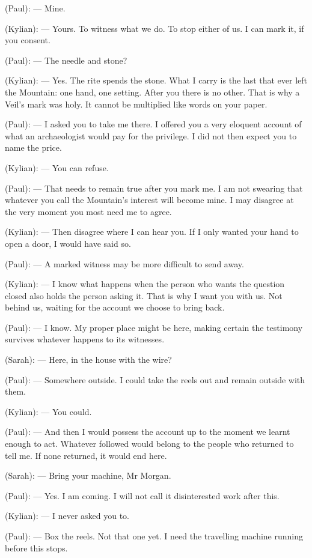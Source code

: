 \begin{room}
(Paul): --- Mine.

(Kylian): --- Yours. To witness what we do. To stop either of us. I can mark it, if you consent.

(Paul): --- The needle and stone?

(Kylian): --- Yes. The rite spends the stone. What I carry is the last that ever left the Mountain: one hand, one setting. After you there is no other. That is why a Veil's mark was holy. It cannot be multiplied like words on your paper.

(Paul): --- I asked you to take me there. I offered you a very eloquent account of what an archaeologist would pay for the privilege. I did not then expect you to name the price.

(Kylian): --- You can refuse.

(Paul): --- That needs to remain true after you mark me. I am not swearing that whatever you call the Mountain's interest will become mine. I may disagree at the very moment you most need me to agree.

(Kylian): --- Then disagree where I can hear you. If I only wanted your hand to open a door, I would have said so.

(Paul): --- A marked witness may be more difficult to send away.

(Kylian): --- I know what happens when the person who wants the question closed also holds the person asking it. That is why I want you with us. Not behind us, waiting for the account we choose to bring back.

(Paul): --- I know. My proper place might be here, making certain the testimony survives whatever happens to its witnesses.

(Sarah): --- Here, in the house with the wire?

(Paul): --- Somewhere outside. I could take the reels out and remain outside with them.

(Kylian): --- You could.

(Paul): --- And then I would possess the account up to the moment we learnt enough to act. Whatever followed would belong to the people who returned to tell me. If none returned, it would end here.

(Sarah): --- Bring your machine, Mr Morgan.

(Paul): --- Yes. I am coming. I will not call it disinterested work after this.

(Kylian): --- I never asked you to.

(Paul): --- Box the reels. Not that one yet. I need the travelling machine running before this stops.


\end{room}
